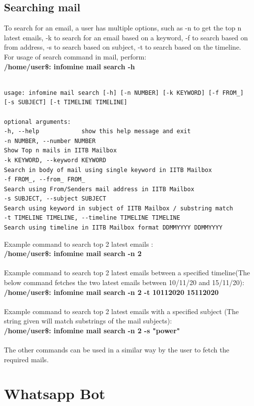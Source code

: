 \documentclass[12pt, letterpaper, twoside]{article}
\begin{document}
\subsection{Searching mail}
To search for an email, a user has multiple options, such as -n to get the top n latest emails, -k to search for an email based on a keyword, -f to search based on from address, -s to search based on subject, -t to search based on the timeline.
For usage of search command in mail, perform:\\
\textbf{/home/user\$: infomine mail search -h}\\
\\

\begin{verbatim}
usage: infomine mail search [-h] [-n NUMBER] [-k KEYWORD] [-f FROM_] [-s SUBJECT] [-t TIMELINE TIMELINE]

optional arguments:
-h, --help            show this help message and exit
-n NUMBER, --number NUMBER
Show Top n mails in IITB Mailbox
-k KEYWORD, --keyword KEYWORD
Search in body of mail using single keyword in IITB Mailbox
-f FROM_, --from_ FROM_
Search using From/Senders mail address in IITB Mailbox
-s SUBJECT, --subject SUBJECT
Search using keyword in subject of IITB Mailbox / substring match
-t TIMELINE TIMELINE, --timeline TIMELINE TIMELINE
Search using timeline in IITB Mailbox format DDMMYYYY DDMMYYYY
\end{verbatim}
Example command to search top 2 latest emails :\\
\textbf{/home/user\$: infomine mail search -n 2}\\
\\
Example command to search top 2 latest emails between a specified timeline(The below command fetches the two latest emails between 10/11/20 and 15/11/20):\\
\textbf{/home/user\$: infomine mail search -n 2 -t 10112020 15112020}\\
\\
Example command to search top 2 latest emails with a specified subject (The string given will match substrings of the mail subjects):\\
\textbf{/home/user\$: infomine mail search -n 2 -s "power"}\\
\\
The other commands can be used in a similar way by the user to fetch the required mails.

\section{Whatsapp Bot}
\end{document}
